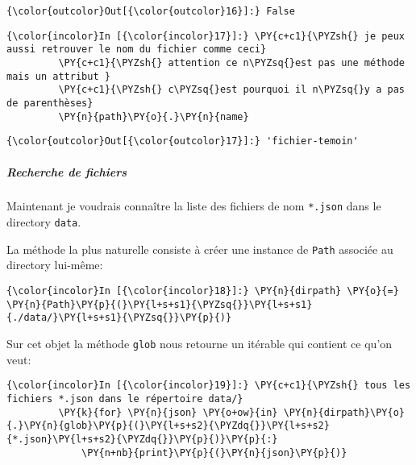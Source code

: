 \begin{Verbatim}[commandchars=\\\{\}]
{\color{outcolor}Out[{\color{outcolor}16}]:} False
\end{Verbatim}
            
    \begin{Verbatim}[commandchars=\\\{\}]
{\color{incolor}In [{\color{incolor}17}]:} \PY{c+c1}{\PYZsh{} je peux aussi retrouver le nom du fichier comme ceci}
         \PY{c+c1}{\PYZsh{} attention ce n\PYZsq{}est pas une méthode mais un attribut }
         \PY{c+c1}{\PYZsh{} c\PYZsq{}est pourquoi il n\PYZsq{}y a pas de parenthèses}
         \PY{n}{path}\PY{o}{.}\PY{n}{name}
\end{Verbatim}


\begin{Verbatim}[commandchars=\\\{\}]
{\color{outcolor}Out[{\color{outcolor}17}]:} 'fichier-temoin'
\end{Verbatim}
            
    \hypertarget{recherche-de-fichiers}{%
\subparagraph{Recherche de fichiers}\label{recherche-de-fichiers}}

    Maintenant je voudrais connaître la liste des fichiers de nom
\texttt{*.json} dans le directory \texttt{data}.

La méthode la plus naturelle consiste à créer une instance de
\texttt{Path} associée au directory lui-même:

    \begin{Verbatim}[commandchars=\\\{\}]
{\color{incolor}In [{\color{incolor}18}]:} \PY{n}{dirpath} \PY{o}{=} \PY{n}{Path}\PY{p}{(}\PY{l+s+s1}{\PYZsq{}}\PY{l+s+s1}{./data/}\PY{l+s+s1}{\PYZsq{}}\PY{p}{)}
\end{Verbatim}


    Sur cet objet la méthode \texttt{glob} nous retourne un itérable qui
contient ce qu'on veut:

    \begin{Verbatim}[commandchars=\\\{\}]
{\color{incolor}In [{\color{incolor}19}]:} \PY{c+c1}{\PYZsh{} tous les fichiers *.json dans le répertoire data/}
         \PY{k}{for} \PY{n}{json} \PY{o+ow}{in} \PY{n}{dirpath}\PY{o}{.}\PY{n}{glob}\PY{p}{(}\PY{l+s+s2}{\PYZdq{}}\PY{l+s+s2}{*.json}\PY{l+s+s2}{\PYZdq{}}\PY{p}{)}\PY{p}{:}
             \PY{n+nb}{print}\PY{p}{(}\PY{n}{json}\PY{p}{)}
\end{Verbatim}


